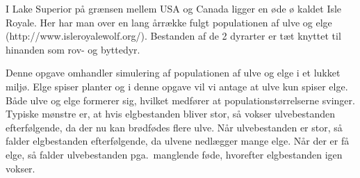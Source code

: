I Lake Superior på grænsen mellem USA og Canada ligger en øde ø kaldet Isle Royale. Her har man over en lang årrække fulgt populationen af ulve og elge (http://www.isleroyalewolf.org/). Bestanden af de 2 dyrarter er tæt knyttet til hinanden som rov- og byttedyr.

Denne opgave omhandler simulering af populationen af ulve og elge i et lukket miljø. Elge spiser planter og i denne opgave vil vi antage at ulve kun spiser elge. Både ulve og elge formerer sig, hvilket medfører at populationstørrelserne svinger. Typiske mønstre er, at hvis elgbestanden bliver stor, så vokser ulvebestanden efterfølgende, da der nu kan brødfødes flere ulve. Når ulvebestanden er stor, så falder elgbestanden efterfølgende, da ulvene nedlægger mange elge. Når der er få elge, så falder ulvebestanden pga.\ manglende føde, hvorefter elgbestanden igen vokser.
